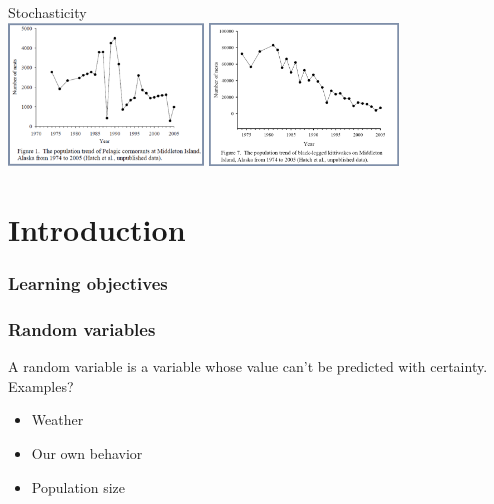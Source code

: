 \documentclass[color=usenames,dvipsnames]{beamer}\usepackage[]{graphicx}\usepackage[]{xcolor}
\begin{document}
\begin{frame}[plain]
  \begin{center}
    {\huge Stochasticity} \\
    \vfill
    \includegraphics[height=3.8cm,keepaspectratio]{figs/pelagic-cormorants} \hspace{0.1cm}
    \includegraphics[height=3.8cm,keepaspectratio]{figs/kittiwakes} %
  \end{center}
\end{frame}




\section{Introduction}


\begin{frame}[plain]
  \frametitle{Learning objectives}
  \tableofcontents%
\end{frame}




\begin{frame}
  \frametitle{Random variables}
  \large
  A random variable is a variable whose value can't be predicted
  with certainty. \\
  \pause
  \vfill
  Examples?
  \begin{itemize}
    \item Weather
    \item Our own behavior
    \item Population size
  \end{itemize}
\end{frame}
\end{document}
